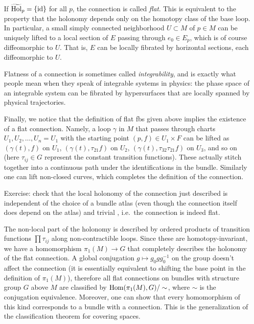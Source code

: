 \begin{example}
	If $\widetilde{\mathrm{Hol}}_p=\{\operatorname{id}\}$ for all $p$, the connection is called \emph{flat}. This is equivalent to the property that the holonomy depends only on the homotopy class of the base loop. In particular, a small simply connected neighborhood $U\subset M$ of $p\in M$ can be uniquely lifted to a local section of $E$ passing through $e_0\in E_p$, which is of course diffeomorphic to $U$. That is, $E$ can be locally fibrated by horizontal sections, each diffeomorphic to $U$. 
	
	Flatness of a connection is sometimes called \emph{integrability}, and is exactly what people mean when they speak of integrable systems in physics: the phase space of an integrable system can be fibrated by hypersurfaces that are locally spanned by physical trajectories.
	
	Finally, we notice that the definition of flat \glspl{fb} given above implies the existence of a flat connection. Namely, a loop $\gamma$ in $M$ that passes through charts $U_1,U_2,\ldots,U_n=U_1$ with the starting point $(p,f)\in U_1\times F$ can be lifted as $(\gamma(t),f)$ on $U_1$, $(\gamma(t),\tau_{21}f)$ on $U_2$, $(\gamma(t),\tau_{32}\tau_{21}f)$ on $U_3$, and so on (here $\tau_{ij}\in G$ represent the constant transition functions). These actually stitch together into a continuous path under the identifications in the bundle. Similarly one can lift non-closed curves, which completes the definition of the connection.
	
	Exercise: check that the local holonomy of the connection just described is independent of the choice of a bundle atlas (even though the connection itself does depend on the atlas) and trivial , i.e.\ the connection is indeed flat.
	
	The non-local part of the holonomy is described by ordered products of transition functions $\prod \tau_{ij}$ along non-contractible loops. Since these are homotopy-invariant, we have a homomorphism $\pi_1(M)\to G$ that completely describes the holonomy of the flat connection. A global conjugation $g\mapsto g_0 g g_0^{-1}$ on the group doesn't affect the connection (it is essentially equivalent to shifting the base point in the definition of $\pi_1(M)$), therefore all flat connections on bundles with structure group $G$ above $M$ are classified by $\operatorname{Hom}(\pi_1(M),G)/\sim$, where $\sim$ is the conjugation equivalence. Moreover, one can show that every homomorphism of this kind corresponds to a bundle with a connection. This is the generalization of the classification theorem for covering spaces.
	

\end{example}
